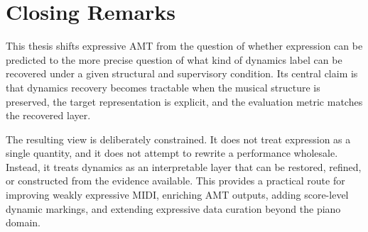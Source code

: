 \section{Closing Remarks}
\label{sec:conclusion:closing}

This thesis shifts expressive AMT from the question of whether expression can be predicted to the more precise question of what kind of dynamics label can be recovered under a given structural and supervisory condition. Its central claim is that dynamics recovery becomes tractable when the musical structure is preserved, the target representation is explicit, and the evaluation metric matches the recovered layer.

The resulting view is deliberately constrained. It does not treat expression as a single quantity, and it does not attempt to rewrite a performance wholesale. Instead, it treats dynamics as an interpretable layer that can be restored, refined, or constructed from the evidence available. This provides a practical route for improving weakly expressive MIDI, enriching AMT outputs, adding score-level dynamic markings, and extending expressive data curation beyond the piano domain.
